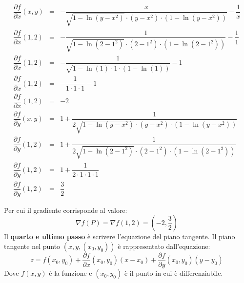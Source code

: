 \documentclass[a4paper]{article}
\begin{document}
	\begin{equation*}
		\begin{array}{rcl}
			\dfrac{\partial f}{\partial x}\left(x,y\right) &=& -\dfrac{x}{\sqrt{1 - \ln\left(y-x^{2}\right)} \cdot \left(y-x^{2}\right) \cdot \left(1 - \ln\left(y-x^{2}\right)\right)} - \dfrac{1}{x} \\ [1.5em]
			\dfrac{\partial f}{\partial x}\left(1,2\right) &=& -\dfrac{1}{\sqrt{1 - \ln\left(2-1^{2}\right)} \cdot \left(2-1^{2}\right) \cdot \left(1 - \ln\left(2-1^{2}\right)\right)} - \dfrac{1}{1} \\ [1.5em]
			\dfrac{\partial f}{\partial x}\left(1,2\right) &=& -\dfrac{1}{\sqrt{1 - \ln\left(1\right)} \cdot 1 \cdot \left(1 - \ln\left(1\right)\right)} - 1 \\ [1.5em]
			\dfrac{\partial f}{\partial x}\left(1,2\right) &=& -\dfrac{1}{1 \cdot 1 \cdot 1} - 1 \\ [1.5em]
			\dfrac{\partial f}{\partial x}\left(1,2\right) &=& -2 \\ [2em]
			\dfrac{\partial f}{\partial y}\left(x,y\right) &=& 1 + \dfrac{1}{2\sqrt{1-\ln\left(y-x^{2}\right)} \cdot \left(y-x^{2}\right) \cdot \left(1-\ln\left(y-x^{2}\right)\right)} \\ [1.5em]
			\dfrac{\partial f}{\partial y}\left(1,2\right) &=& 1 + \dfrac{1}{2\sqrt{1-\ln\left(2-1^{2}\right)} \cdot \left(2-1^{2}\right) \cdot \left(1-\ln\left(2-1^{2}\right)\right)} \\ [1.5em]
			\dfrac{\partial f}{\partial y}\left(1,2\right) &=& 1 + \dfrac{1}{2 \cdot 1 \cdot 1 \cdot 1} \\ [1.5em]
			\dfrac{\partial f}{\partial y}\left(1,2\right) &=& \dfrac{3}{2}
		\end{array}
	\end{equation*}\newpage

	\noindent
	Per cui il gradiente corrisponde al valore:
	\begin{equation*}
		\nabla f\left(P\right) = \nabla f\left(1,2\right) = \left(-2, \dfrac{3}{2}\right)
	\end{equation*}
	Il \textbf{quarto e ultimo passo} è scrivere l'equazione del piano tangente. Il piano tangente nel punto $\left(x,y,\left(x_{0}, y_{0}\right)\right)$ è rappresentato dall'equazione:
	\begin{equation*}
		z = f\left(x_{0},y_{0}\right) + \dfrac{\partial f}{\partial x}\left(x_{0}, y_{0}\right)\left(x-x_{0}\right) + \dfrac{\partial f}{\partial y}\left(x_{0}, y_{0}\right)\left(y-y_{0}\right)
	\end{equation*}
	Dove $f\left(x,y\right)$ è la funzione e $\left(x_{0},y_{0}\right)$ è il punto in cui è differenziabile.
\end{document}
